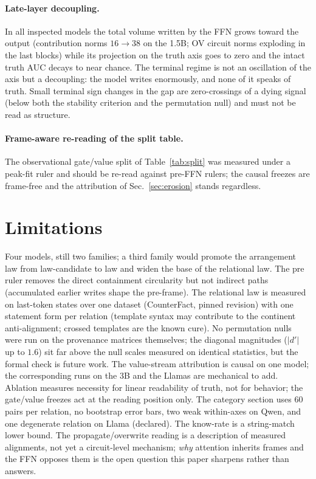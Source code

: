 \documentclass[11pt]{article}
\begin{document}
\paragraph{Late-layer decoupling.} In all inspected models the total volume
written by the FFN grows toward the output (contribution norms $16 \to 38$
on the 1.5B; OV circuit norms exploding in the last blocks) while its
projection on the truth axis goes to zero and the intact truth AUC decays to
near chance. The terminal regime is not an oscillation of the axis but a
decoupling: the model writes enormously, and none of it speaks of truth.
Small terminal sign changes in the gap are zero-crossings of a dying signal
(below both the stability criterion and the permutation null) and must not
be read as structure.

\paragraph{Frame-aware re-reading of the split table.} The observational
gate/value split of Table~\ref{tab:split} was measured under a peak-fit
ruler and should be re-read against pre-FFN rulers; the causal freezes are
frame-free and the attribution of Sec.~\ref{sec:erosion} stands regardless.

\section{Limitations}
\label{sec:limits}

Four models, still two families; a third family would promote the
arrangement law from law-candidate to law and widen the base of the
relational law. The pre ruler removes the direct containment circularity
but not indirect paths (accumulated earlier writes shape the pre-frame). The
relational law is measured on last-token states over one dataset
(CounterFact, pinned revision) with one statement form per relation
(template syntax may contribute to the continent anti-alignment; crossed
templates are the known cure). No permutation nulls were run on the
provenance matrices themselves; the diagonal magnitudes ($|d'|$ up to
$1.6$) sit far above the null scales measured on identical statistics, but
the formal check is future work. The value-stream attribution is causal on
one model; the corresponding runs on the 3B and the Llamas are mechanical to
add. Ablation measures necessity for linear readability of truth, not for
behavior; the gate/value freezes act at the reading position only. The
category section uses $60$ pairs per relation, no bootstrap error bars, two
weak within-axes on Qwen, and one degenerate relation on Llama (declared).
The know-rate is a string-match lower bound. The propagate/overwrite reading
is a description of measured alignments, not yet a circuit-level mechanism;
\emph{why} attention inherits frames and the FFN opposes them is the open
question this paper sharpens rather than answers.
\end{document}
